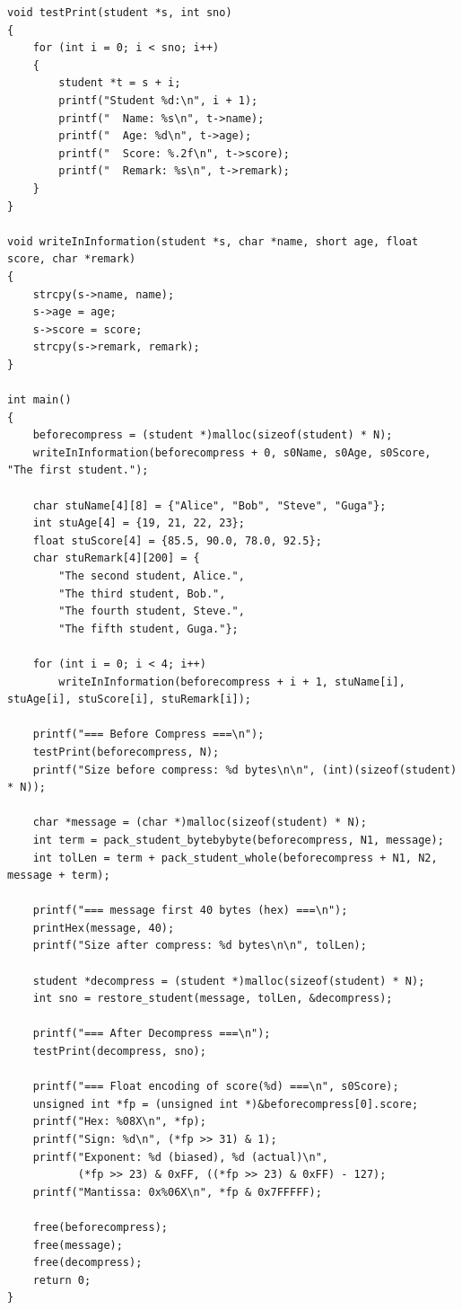 \begin{lstlisting}[basicstyle=\ttfamily\zihao{5},lineskip=-1pt]
void testPrint(student *s, int sno)
{
    for (int i = 0; i < sno; i++)
    {
        student *t = s + i;
        printf("Student %d:\n", i + 1);
        printf("  Name: %s\n", t->name);
        printf("  Age: %d\n", t->age);
        printf("  Score: %.2f\n", t->score);
        printf("  Remark: %s\n", t->remark);
    }
}

void writeInInformation(student *s, char *name, short age, float score, char *remark)
{
    strcpy(s->name, name);
    s->age = age;
    s->score = score;
    strcpy(s->remark, remark);
}

int main()
{
    beforecompress = (student *)malloc(sizeof(student) * N);
    writeInInformation(beforecompress + 0, s0Name, s0Age, s0Score, "The first student.");

    char stuName[4][8] = {"Alice", "Bob", "Steve", "Guga"};
    int stuAge[4] = {19, 21, 22, 23};
    float stuScore[4] = {85.5, 90.0, 78.0, 92.5};
    char stuRemark[4][200] = {
        "The second student, Alice.",
        "The third student, Bob.",
        "The fourth student, Steve.",
        "The fifth student, Guga."};

    for (int i = 0; i < 4; i++)
        writeInInformation(beforecompress + i + 1, stuName[i], stuAge[i], stuScore[i], stuRemark[i]);

    printf("=== Before Compress ===\n");
    testPrint(beforecompress, N);
    printf("Size before compress: %d bytes\n\n", (int)(sizeof(student) * N));

    char *message = (char *)malloc(sizeof(student) * N);
    int term = pack_student_bytebybyte(beforecompress, N1, message);
    int tolLen = term + pack_student_whole(beforecompress + N1, N2, message + term);

    printf("=== message first 40 bytes (hex) ===\n");
    printHex(message, 40);
    printf("Size after compress: %d bytes\n\n", tolLen);

    student *decompress = (student *)malloc(sizeof(student) * N);
    int sno = restore_student(message, tolLen, &decompress);

    printf("=== After Decompress ===\n");
    testPrint(decompress, sno);

    printf("=== Float encoding of score(%d) ===\n", s0Score);
    unsigned int *fp = (unsigned int *)&beforecompress[0].score;
    printf("Hex: %08X\n", *fp);
    printf("Sign: %d\n", (*fp >> 31) & 1);
    printf("Exponent: %d (biased), %d (actual)\n",
           (*fp >> 23) & 0xFF, ((*fp >> 23) & 0xFF) - 127);
    printf("Mantissa: 0x%06X\n", *fp & 0x7FFFFF);

    free(beforecompress);
    free(message);
    free(decompress);
    return 0;
}
\end{lstlisting}

